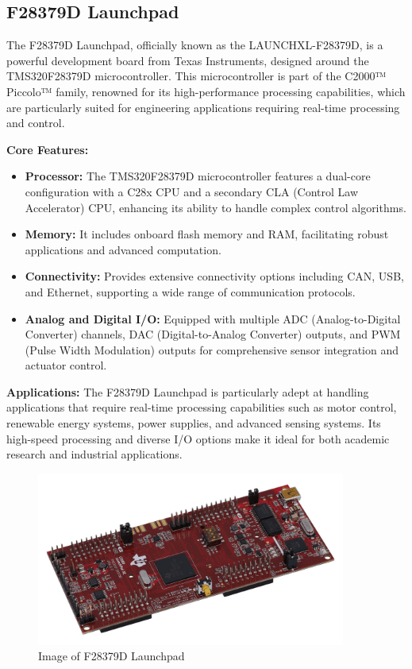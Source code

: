 \subsection{F28379D Launchpad}

The F28379D Launchpad, officially known as the LAUNCHXL-F28379D, is a powerful development board from Texas Instruments, designed around the TMS320F28379D microcontroller. This microcontroller is part of the C2000™ Piccolo™ family, renowned for its high-performance processing capabilities, which are particularly suited for engineering applications requiring real-time processing and control.

\textbf{Core Features:}
\begin{itemize}
    \item \textbf{Processor:} The TMS320F28379D microcontroller features a dual-core configuration with a C28x CPU and a secondary CLA (Control Law Accelerator) CPU, enhancing its ability to handle complex control algorithms.
    \item \textbf{Memory:} It includes onboard flash memory and RAM, facilitating robust applications and advanced computation.
    \item \textbf{Connectivity:} Provides extensive connectivity options including CAN, USB, and Ethernet, supporting a wide range of communication protocols.
    \item \textbf{Analog and Digital I/O:} Equipped with multiple ADC (Analog-to-Digital Converter) channels, DAC (Digital-to-Analog Converter) outputs, and PWM (Pulse Width Modulation) outputs for comprehensive sensor integration and actuator control.
\end{itemize}

\textbf{Applications:}
The F28379D Launchpad is particularly adept at handling applications that require real-time processing capabilities such as motor control, renewable energy systems, power supplies, and advanced sensing systems. Its high-speed processing and diverse I/O options make it ideal for both academic research and industrial applications.

\begin{figure}[H]
    \centering
    \includegraphics[width=4in]{sections/section4/images/f23879d/launchxl-f28379d-angled.png}
    \caption{Image of F28379D Launchpad}
\end{figure}

